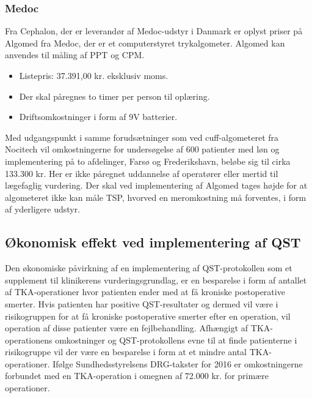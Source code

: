 \subsubsection{Medoc}
Fra Cephalon, der er leverandør af Medoc-udstyr i Danmark er oplyst priser på Algomed fra Medoc, der er et computerstyret trykalgometer. Algomed kan anvendes til måling af PPT og CPM. \citep{AlgomedOnline} \citep{AlgomedData}

\begin{itemize}  
\item Listepris: 37.391,00 kr. eksklusiv moms.
\item Der skal påregnes to timer per person til oplæring.
\item Driftsomkostninger i form af 9V batterier.
\end{itemize}

Med udgangspunkt i samme forudsætninger som ved cuff-algometeret fra Nocitech vil omkostningerne for undersøgelse af 600 patienter med løn og implementering på to afdelinger, Farsø og Frederikshavn, beløbe sig til cirka 133.300 kr. Her er ikke påregnet uddannelse af operatører eller mertid til lægefaglig vurdering. Der skal ved implementering af Algomed tages højde for at algometeret  ikke kan måle TSP, hvorved en meromkostning må forventes, i form af yderligere udstyr.

\subsection{Økonomisk effekt ved implementering af QST}
Den økonomiske påvirkning af en implementering af QST-protokollen som et supplement til klinikerens vurderingsgrundlag, er en besparelse i form af antallet af TKA-operationer hvor patienten ender med at få kroniske postoperative smerter. Hvis patienten har positive QST-resultater og dermed vil være i risikogruppen for at få kroniske postoperative smerter efter en operation, vil operation af disse patienter være en fejlbehandling. Afhængigt af TKA-operationens omkostninger og QST-protokollens evne til at finde patienterne i risikogruppe vil der være en besparelse i form at et mindre antal TKA-operationer. Ifølge Sundhedsstyrelsens DRG-takster for 2016 er omkostningerne forbundet med en TKA-operation i omegnen af 72.000 kr. for primære operationer. \citep{Takst2016}

